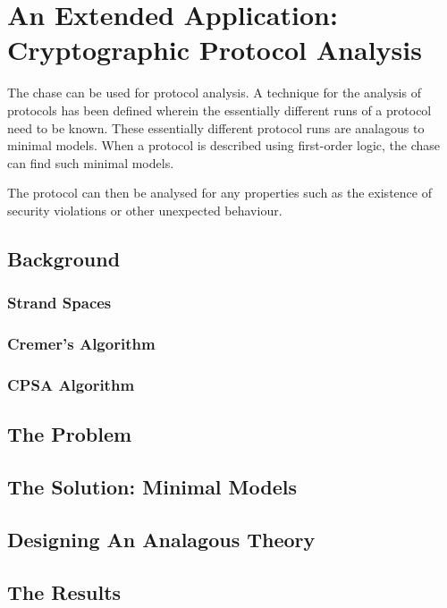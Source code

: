 \section{An Extended Application: \\ Cryptographic Protocol Analysis}

	The chase can be used for protocol analysis. A technique for the analysis
	of protocols has been defined wherein the essentially different runs of a
	protocol need to be known. These essentially different protocol runs are
	analagous to minimal models.  When a protocol is described using
	first-order logic, the chase can find such minimal models.

	The protocol can then be analysed for any properties such as the existence
	of security violations or other unexpected behaviour.

	\subsection{Background}

		\subsubsection{Strand Spaces}

		\subsubsection{Cremer's Algorithm}

		\subsubsection{CPSA Algorithm}

	\subsection{The Problem}

		

	\subsection{The Solution: Minimal Models}

	\subsection{Designing An Analagous Theory}

	\subsection{The Results}
